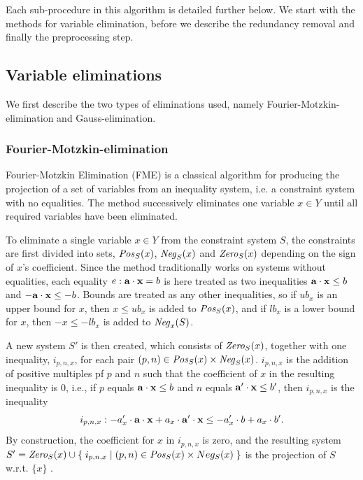 Each sub-procedure in this algorithm is detailed further below. We start with the methods for variable elimination, before we describe the redundancy removal and finally the preprocessing step.

\subsection{Variable eliminations}
We first describe the two types of eliminations used, namely Fourier-Motzkin-elimination and Gauss-elimination. 
\subsubsection{Fourier-Motzkin-elimination}
Fourier-Motzkin Elimination (FME) is a classical algorithm for producing the projection of a set of variables from an inequality system, i.e. a constraint system with no equalities.
The method successively eliminates one variable $x\in Y$ until all required variables have been eliminated.  

To eliminate a single variable $x\in Y$ from the constraint system $S$, the constraints are first divided into sets, $\mathit{Pos}_S(x)$, $\mathit{Neg}_S(x)$ and $\mathit{Zero}_S(x)$ depending on the sign of $x$'s coefficient. Since the method traditionally works on systems without equalities, each equality $e: \mathbf{a}\cdot\mathbf{x} = b$ is here treated as two inequalities $\mathbf{a}\cdot\mathbf{x} \leq b$ and $-\mathbf{a}\cdot\mathbf{x} \leq -b$. Bounds are treated as any other inequalities, so if $ub_x$ is an upper bound for $x$, then $x\leq ub_x$ is added to $\mathit{Pos}_S(x)$, and if $lb_x$ is a lower bound for $x$, then $-x\leq - lb_x$ is added to $\mathit{Neg}_x(S)$.

A new system $S'$ is then created, which consists of $\mathit{Zero}_S(x)$, together with one inequality, $i_{p,n,x}$, for each pair $(p,n)\in \mathit{Pos}_S(x)\times \mathit{Neg}_S(x)$. $i_{p,n,x}$ is the addition of positive multiples pf $p$ and $n$ such that the coefficient of $x$ in the resulting inequality is $0$, i.e., if $p$ equals $\mathbf{a}\cdot\mathbf{x} \leq b$ and $n$ equals $\mathbf{a}'\cdot\mathbf{x} \leq b'$, then $i_{p,n,x}$ is the inequality 
\[
i_{p,n,x}: -a'_x\cdot \mathbf{a}\cdot\mathbf{x} + a_x\cdot \mathbf{a}'\cdot\mathbf{x} \leq -a'_x\cdot b + a_x\cdot b'.
\]
By construction, the coefficient for $x$ in $i_{p,n,x}$ is zero, and the resulting system $S' = \mathit{Zero}_S(x) \cup\\
\{\;{i_{p,n,x}}\;|\;{(p,n)\in \mathit{Pos}_S(x)\times Neg_S(x)}\;\}$ is the projection of $S$ w.r.t. $\{x\}$ \cite{Martin99}. %


